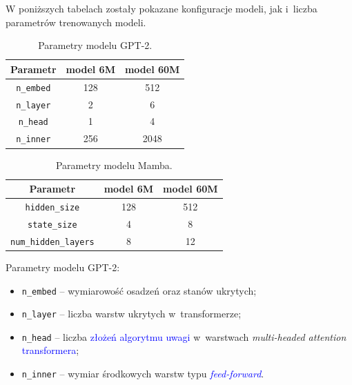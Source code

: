 \documentclass[data-science]{agh-wi} %
\begin{document}
W poniższych tabelach zostały pokazane konfiguracje modeli, jak i~liczba parametrów trenowanych modeli.

\begin{table}[!htb]
    \caption{Parametry modelu GPT-2.}
    \centering
    \begin{tabular}{||c c c||}
        \hline
        Parametr          & model 6M & model 60M \\ [0.5ex]
        \hline\hline
        \texttt{n\_embed} & 128      & 512       \\
        \hline
        \texttt{n\_layer} & 2        & 6         \\
        \hline
        \texttt{n\_head}  & 1        & 4         \\
        \hline
        \texttt{n\_inner} & 256      & 2048      \\
        \hline
    \end{tabular}
\end{table}

\begin{table}[!htb]
    \caption{Parametry modelu Mamba.}
    \centering
    \begin{tabular}{||c c c||}
        \hline
        Parametr                     & model 6M & model 60M \\ [0.5ex]
        \hline\hline
        \texttt{hidden\_size}        & 128      & 512       \\
        \hline
        \texttt{state\_size}         & 4        & 8         \\
        \hline
        \texttt{num\_hidden\_layers} & 8        & 12        \\
        \hline
    \end{tabular}
\end{table}

Parametry modelu GPT-2:
\begin{itemize}
    \item \texttt{n\_embed} -- wymiarowość osadzeń oraz stanów ukrytych;
    \item \texttt{n\_layer} -- liczba warstw ukrytych w~transformerze;
    \item \texttt{n\_head} -- liczba \textcolor{blue}{złożeń algorytmu uwagi} w~warstwach \textit{multi-headed attention} \textcolor{blue}{transformera};
    \item \texttt{n\_inner} -- wymiar środkowych warstw typu \textcolor{blue}{\textit{feed-forward}}.
\end{itemize}
\end{document}

